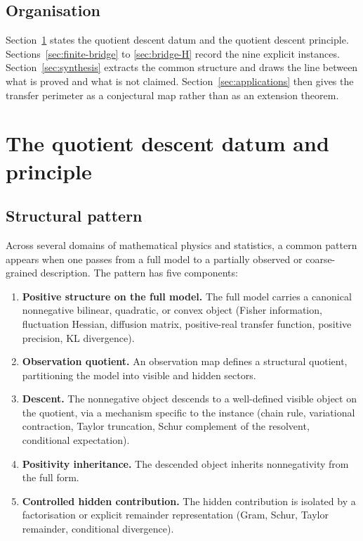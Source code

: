 \documentclass[11pt,a4paper]{article}
\numberwithin{equation}{section}
\theoremstyle{thmcompact}
\theoremstyle{remark}
\begin{document}
\subsection{Organisation}

Section~\ref{sec:qdp} states the quotient descent datum and the quotient descent principle. Sections~\ref{sec:finite-bridge} to \ref{sec:bridge-H} record the nine explicit instances. Section~\ref{sec:synthesis} extracts the common structure and draws the line between what is proved and what is not claimed. Section~\ref{sec:applications} then gives the transfer perimeter as a conjectural map rather than as an extension theorem.


\section{The quotient descent datum and principle}
\label{sec:qdp}

\subsection{Structural pattern}

Across several domains of mathematical physics and statistics, a common pattern appears when one passes from a full model to a partially observed or coarse-grained description. The pattern has five components:

\begin{enumerate}[label=(\roman*)]
\item \textbf{Positive structure on the full model.} The full model carries a canonical nonnegative bilinear, quadratic, or convex object (Fisher information, fluctuation Hessian, diffusion matrix, positive-real transfer function, positive precision, KL divergence).
\item \textbf{Observation quotient.} An observation map defines a structural quotient, partitioning the model into visible and hidden sectors.
\item \textbf{Descent.} The nonnegative object descends to a well-defined visible object on the quotient, via a mechanism specific to the instance (chain rule, variational contraction, Taylor truncation, Schur complement of the resolvent, conditional expectation).
\item \textbf{Positivity inheritance.} The descended object inherits nonnegativity from the full form.
\item \textbf{Controlled hidden contribution.} The hidden contribution is isolated by a factorisation or explicit remainder representation (Gram, Schur, Taylor remainder, conditional divergence).
\end{enumerate}
\end{document}
